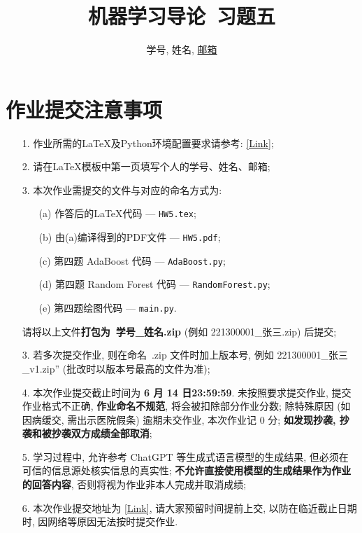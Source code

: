 \documentclass[a4paper,UTF8]{article}
\numberwithin{equation}{section}
\theoremstyle{definition}
\begin{document}
\title{机器学习导论\ 习题五}
\author{学号, 姓名, \href{mailto:邮箱}{邮箱}}
\maketitle
\section*{作业提交注意事项}
\begin{tcolorbox}
	\begin{enumerate}
    \item[1.] 作业所需的LaTeX及Python环境配置要求请参考: \href{https://www.lamda.nju.edu.cn/ML2024Spring/supplemantary/environment.pdf}{[Link]};
		\item[2.] 请在LaTeX模板中第一页填写个人的学号、姓名、邮箱;
		\item[3.] 本次作业需提交的文件与对应的命名方式为:
            \begin{enumerate}
                \item [(a)] 作答后的LaTeX代码 --- \texttt{HW5.tex};
                \item [(b)] 由(a)编译得到的PDF文件 --- \texttt{HW5.pdf};
                \item [(c)] 第四题 AdaBoost 代码 --- \texttt{AdaBoost.py};
                \item [(d)] 第四题 Random Forest 代码 --- \texttt{RandomForest.py};
                \item [(e)] 第四题绘图代码 --- \texttt{main.py}.
            \end{enumerate}
            请将以上文件{\color{red}\textbf{打包为~学号\hspace{0em}\_\hspace{0em}姓名.zip}} (例如 221300001\hspace{0em}\_\hspace{0em}张三.zip) 后提交;
		\item[3.] 若多次提交作业, 则在命名~.zip 文件时加上版本号, 例如 221300001\_\hspace{0em}张三\hspace{0em}\_v1.zip” (批改时以版本号最高的文件为准);
		\item[4.] 本次作业提交截止时间为 {\color{red}\textbf{ 6 月 14 日23:59:59}}. 未按照要求提交作业, 提交作业格式不正确, {\color{red}\textbf{作业命名不规范}}, 将会被扣除部分作业分数; 除特殊原因 (如因病缓交, 需出示医院假条) 逾期未交作业, 本次作业记 0 分; {\color{red}\textbf{如发现抄袭, 抄袭和被抄袭双方成绩全部取消}};
        \item[5.] 学习过程中, 允许参考 ChatGPT 等生成式语言模型的生成结果, 但必须在可信的信息源处核实信息的真实性; {\color{red}\textbf{不允许直接使用模型的生成结果作为作业的回答内容}}, 否则将视为作业非本人完成并取消成绩;
		\item[6.] 本次作业提交地址为 \href{https://box.nju.edu.cn/u/d/06ad1043a3dd4ecebc80/}{[Link]}, 请大家预留时间提前上交, 以防在临近截止日期时, 因网络等原因无法按时提交作业.
	\end{enumerate}
\end{tcolorbox}
\newpage
\end{document}
